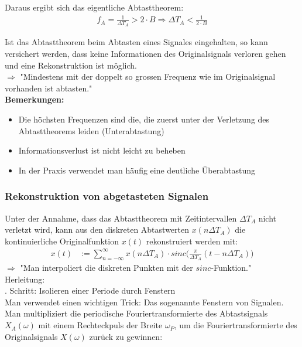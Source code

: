 \documentclass[12pt,a4paper]{scrartcl}
\begin{document}
\noindent Daraus ergibt sich das eigentliche Abtasttheorem:
\begin{equation}
  \label{eq:14}
  \begin{split}
    f_A = \frac{1}{\Delta T_A} > 2 \cdot B
    \Rightarrow \Delta T_A < \frac{1}{2 \cdot B}
  \end{split}
\end{equation} 

\noindent Ist das Abtasttheorem beim Abtasten eines Signales eingehalten, so kann versichert werden,
dass keine Informationen des Originalsignals verloren gehen und eine Rekonstruktion ist möglich.\\
$\Rightarrow$ "Mindestens mit der doppelt so grossen Frequenz wie im Originalsignal vorhanden ist abtasten." \\

\noindent  \textbf{Bemerkungen:}
  \begin{itemize}
    \item Die höchsten Frequenzen sind die, die zuerst unter der Verletzung des Abtasttheorems leiden (Unterabtastung)
    \item Informationsverlust ist nicht leicht zu beheben
    \item In der Praxis verwendet man häufig eine deutliche Überabtastung \\
  \end{itemize}

  \subsubsection{Rekonstruktion von abgetasteten Signalen}
  \label{sec.sub:sub:rekonstruktion-von-abgetasteten-signalen}

  \noindent   Unter der Annahme, dass das Abtasttheorem mit Zeitintervallen $\Delta T_A$ nicht verletzt wird,
  kann aus den diskreten Abtastwerten $x(n \Delta T_A)$ 
  die kontinuierliche Originalfunktion $x(t)$ rekonstruiert werden mit:
  \begin{equation}
    \label{eq:15}
    \begin{split}
     x(t) &:= \sum_{n=-\infty}^{\infty} x(n \Delta T_A) \cdot sinc\bigg(\frac{\pi}{\Delta T_A}(t-n\Delta T_A)\bigg)
    \end{split}
  \end{equation} 
  $\Rightarrow$ "Man interpoliert die diskreten Punkten mit der $sinc$-Funktion." \\

  \noindent Herleitung: \\
  . Schritt: Isolieren einer Periode durch Fenstern\\
  Man verwendet einen wichtigen Trick: Das sogenannte Fenstern von Signalen. \\
  Man multipliziert die periodische Fouriertransformierte des Abtastsignals $X_A(\omega)$ 
  mit einem Rechteckpuls der Breite $\omega_P$, 
  um die Fouriertransformierte des Originalsignals $X(\omega)$ zurück zu gewinnen:\\
  
\end{document}
